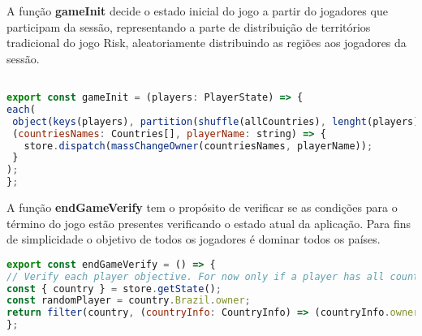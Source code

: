 \documentclass[rel_mlp]{iiufrgs}
\begin{document}
A função \textbf{gameInit} decide o estado inicial do jogo a partir do jogadores que participam da sessão, representando a parte de distribuição de territórios tradicional do jogo Risk, aleatoriamente distribuindo as regiões aos jogadores da sessão.
\begin{lstlisting}[language = JavaScript]

export const gameInit = (players: PlayerState) => {
each(
 object(keys(players), partition(shuffle(allCountries), lenght(players))) as InitCountries,
 (countriesNames: Countries[], playerName: string) => {
   store.dispatch(massChangeOwner(countriesNames, playerName));
 }
);
};
\end{lstlisting}

A função \textbf{endGameVerify} tem o propósito de verificar se as condições para o término do jogo estão presentes verificando o estado atual da aplicação. Para fins de simplicidade o objetivo de todos os jogadores é dominar todos os países.
\begin{lstlisting}[language = JavaScript]
export const endGameVerify = () => {
// Verify each player objective. For now only if a player has all countries
const { country } = store.getState();
const randomPlayer = country.Brazil.owner;
return filter(country, (countryInfo: CountryInfo) => (countryInfo.owner !== randomPlayer)) === [];
};


\end{lstlisting}
\end{document}
